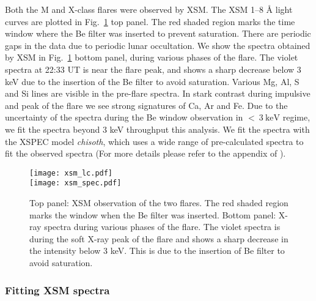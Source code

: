 Both the M and X-class flares were observed by XSM. The XSM 1{--}8 {\AA} light curves are plotted in Fig.~\ref{fig:xsm-obs} top panel. The red shaded region marks the time window where the Be filter was inserted to prevent saturation. There are periodic gaps in the data due to periodic lunar occultation. We show the spectra obtained by XSM in Fig.~\ref{fig:xsm-obs} bottom panel, during various phases of the flare. The violet spectra at 22:33 UT is near the flare peak, and shows a sharp decrease below 3 keV due to the insertion of the Be filter to avoid saturation. Various Mg, Al, S and Si lines are visible in the pre-flare spectra. In stark contrast during impulsive and peak of the flare we see strong signatures of Ca, Ar and Fe. Due to the uncertainty of the spectra during the Be window observation in $<~3~\mathrm{keV}$ regime, we fit the spectra beyond 3 keV throughput this analysis. We fit the spectra with the XSPEC model {\it chisoth}, which uses a wide range of pre-calculated spectra to fit the observed spectra (For more details please refer to the appendix of \cite{mondal21}).

\begin{figure}[ht!]
\centering
    \texttt{[image: xsm\_lc.pdf]} \\
    \texttt{[image: xsm\_spec.pdf]}
    \caption{Top panel: XSM observation of the two flares. The red shaded region marks the window when the Be filter was inserted. Bottom panel: X-ray spectra during various phases of the flare. The violet spectra is during the soft X-ray peak of the flare and shows a sharp decrease in the intensity below 3 keV. This is due to the insertion of Be filter to avoid saturation.}
    \label{fig:xsm-obs}
\end{figure}

\subsubsection{Fitting XSM spectra}\label{sec:xsm-fit}

